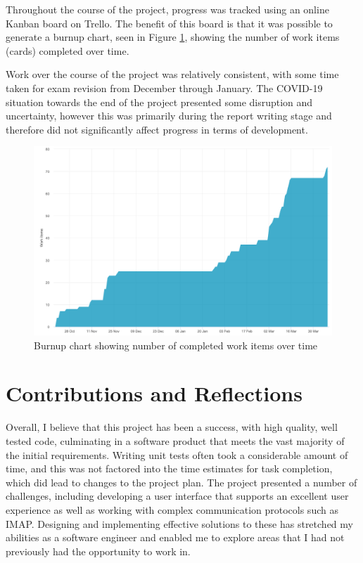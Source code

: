 Throughout the course of the project, progress was tracked using an online Kanban board on Trello. The benefit of this board is that it was possible to generate a burnup chart, seen in Figure \ref{fig:burnup}, showing the number of work items (cards) completed over time.

Work over the course of the project was relatively consistent, with some time taken for exam revision from December through January. The COVID-19 situation towards the end of the project presented some disruption and uncertainty, however this was primarily during the report writing stage and therefore did not significantly affect progress in terms of development.

\begin{figure}[h!]
  \centering
  \includegraphics[width=\textwidth]{images/burnup.png}
  \caption{Burnup chart showing number of completed work items over time}
  \label{fig:burnup}
\end{figure}

\section{Contributions and Reflections}


Overall, I believe that this project has been a success, with high quality, well tested code, culminating in a software product that meets the vast majority of the initial requirements. Writing unit tests often took a considerable amount of time, and this was not factored into the time estimates for task completion, which did lead to changes to the project plan. The project presented a number of challenges, including developing a user interface that supports an excellent user experience as well as working with complex communication protocols such as IMAP. Designing and implementing effective solutions to these has stretched my abilities as a software engineer and enabled me to explore areas that I had not previously had the opportunity to work in.

